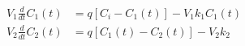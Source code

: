 \begin{equation}
  \begin{aligned}
    V_1 \frac{d}{dt}C_1(t) & = q [C_i - C_1(t)] - V_1 k_1 C_1(t)
    \\
    V_2 \frac{d}{dt}C_2(t) & = q [C_1(t) - C_2(t)] - V_2 k_2
  \end{aligned}
  \label{eq:two_stirred_tank02_1}
\end{equation}